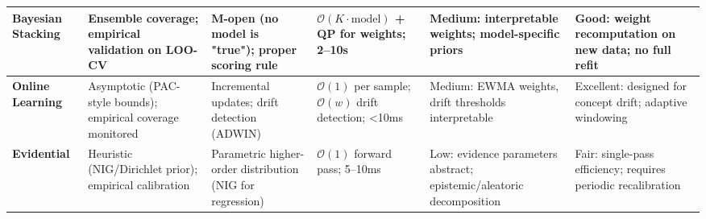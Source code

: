 \begin{landscape}
\begin{table}[p]
\begin{threeparttable}
\begin{tabularx}{\linewidth}{@{} l X X X X X @{}}
    \textbf{Bayesian Stacking}
    & Ensemble coverage; empirical validation on LOO-CV
    & M-open (no model is "true"); proper scoring rule
    & $\mathcal{O}(K \cdot \text{model})$ + QP for weights\tnote{c}; 2--10s
    & Medium: interpretable weights; model-specific priors
    & Good: weight recomputation on new data; no full refit \\

    \midrule

    \textbf{Online Learning}
    & Asymptotic (PAC-style bounds); empirical coverage monitored
    & Incremental updates; drift detection (ADWIN)
    & $\mathcal{O}(1)$ per sample; $\mathcal{O}(w)$ drift detection\tnote{d}; <10ms
    & Medium: EWMA weights, drift thresholds interpretable
    & Excellent: designed for concept drift; adaptive windowing \\

    \midrule

    \textbf{Evidential}
    & Heuristic (NIG/Dirichlet prior); empirical calibration
    & Parametric higher-order distribution (NIG for regression)
    & $\mathcal{O}(1)$ forward pass; 5--10ms
    & Low: evidence parameters abstract; epistemic/aleatoric decomposition
    & Fair: single-pass efficiency; requires periodic recalibration \\

    \bottomrule
  \end{tabularx}


\end{threeparttable}
\end{table}
\end{landscape}
